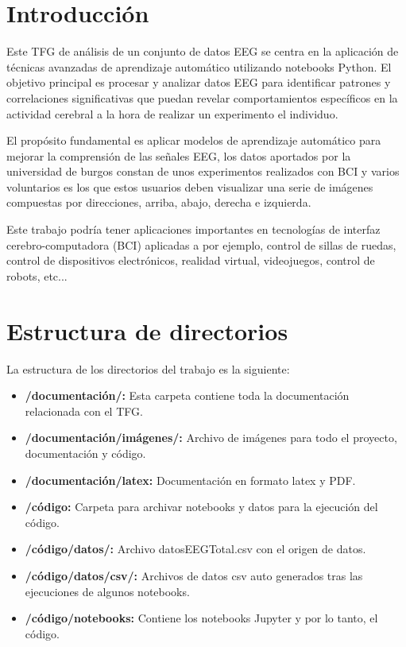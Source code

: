 
\section{Introducción}

Este TFG de análisis de un conjunto de datos EEG se centra en la aplicación de técnicas avanzadas de aprendizaje automático utilizando notebooks Python. El objetivo principal es procesar y analizar datos EEG para identificar patrones y correlaciones significativas que puedan revelar comportamientos específicos en la actividad cerebral a la hora de realizar un experimento el individuo.

El propósito fundamental es aplicar modelos de aprendizaje automático para mejorar la comprensión de las señales EEG, los datos aportados por la universidad de burgos constan de unos experimentos realizados con BCI y varios voluntarios es los que estos usuarios deben visualizar una serie de imágenes compuestas por direcciones, arriba, abajo, derecha e izquierda.

Este trabajo podría tener aplicaciones importantes en tecnologías de interfaz cerebro-computadora (BCI) aplicadas a por ejemplo,  control de sillas de ruedas, control de dispositivos electrónicos, realidad virtual, videojuegos, control de robots, etc...


\section{Estructura de directorios}

La estructura de los directorios del trabajo es la siguiente:

  \begin{itemize}
  \tightlist
  \item
   \textbf{/documentación/:} Esta carpeta contiene toda la documentación relacionada con el TFG.
  \item
   \textbf{/documentación/imágenes/:} Archivo de imágenes para todo el proyecto, documentación y código.
  \item
   \textbf{/documentación/latex:} Documentación en formato latex y PDF.
  \item
   \textbf{/código:} Carpeta para archivar notebooks y datos para la ejecución del código.
  \item
   \textbf{/código/datos/:} Archivo datosEEGTotal.csv con el origen de datos.
  \item
   \textbf{/código/datos/csv/:} Archivos de datos csv auto generados tras las ejecuciones de algunos notebooks.
  \item
   \textbf{/código/notebooks:} Contiene los notebooks Jupyter y por lo tanto, el código.
  \end{itemize} 
  
